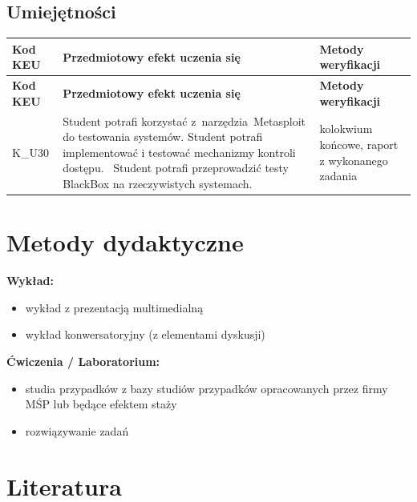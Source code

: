 \documentclass[12pt, a4paper]{article}
\newcommand{\thdrule}{\noalign{\global\setlength{\extrarowheight}{0pt}}}
\newcommand{\thdend}{\noalign{\global\setlength{\extrarowheight}{3pt}}}
\begin{document}
\subsection*{Umiejętności}
{\scriptsize
\begin{longtable}{m{1.6cm}m{9.0cm}m{4.2cm}}
\thdrule\toprule
\rowcolor{pjatkRed} {\color{white}\footnotesize\textbf{\vphantom{Ag}Kod KEU}} & {\color{white}\footnotesize\textbf{\vphantom{Ag}Przedmiotowy efekt uczenia się}} & {\color{white}\footnotesize\textbf{\vphantom{Ag}Metody weryfikacji}} \\
\midrule\thdend
\endfirsthead
\thdrule\toprule
\rowcolor{pjatkRed} {\color{white}\footnotesize\textbf{\vphantom{Ag}Kod KEU}} & {\color{white}\footnotesize\textbf{\vphantom{Ag}Przedmiotowy efekt uczenia się}} & {\color{white}\footnotesize\textbf{\vphantom{Ag}Metody weryfikacji}} \\
\midrule\thdend
\endhead
  \rowcolor{tableRowLight} K\_U30 & Student potrafi korzystać z narzędzia Metasploit do testowania systemów. Student potrafi implementować i testować mechanizmy kontroli dostępu.  Student potrafi przeprowadzić testy BlackBox na rzeczywistych systemach. & kolokwium końcowe, raport z wykonanego zadania \\
\bottomrule
\end{longtable}}

\section{Metody dydaktyczne}

\textbf{Wykład:}
\begin{itemize}
  \item wykład z prezentacją multimedialną
  \item wykład konwersatoryjny (z elementami dyskusji)
\end{itemize}
\vspace{4pt}
\textbf{Ćwiczenia / Laboratorium:}
\begin{itemize}
  \item studia przypadków z bazy studiów przypadków opracowanych przez firmy MŚP lub będące efektem staży
  \item rozwiązywanie zadań
\end{itemize}
\vspace{4pt}


\section{Literatura}
\end{document}

